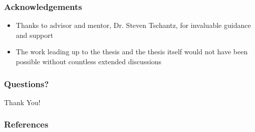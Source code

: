 \documentclass{beamer}
\begin{document}
\begin{frame}
\frametitle{Acknowledgements}
\begin{itemize}
\item Thanks to advisor and mentor, Dr. Steven Tschantz, for invaluable guidance and support
\item The work leading up to the thesis and the thesis itself would not have been possible without countless extended discussions
\end{itemize}
\end{frame}

\begin{frame}
\frametitle{Questions?}
\centering
\Huge{Thank You!}
\end{frame}

\begin{frame}
\frametitle{References}
\printbibliography
\end{frame}
\end{document}

